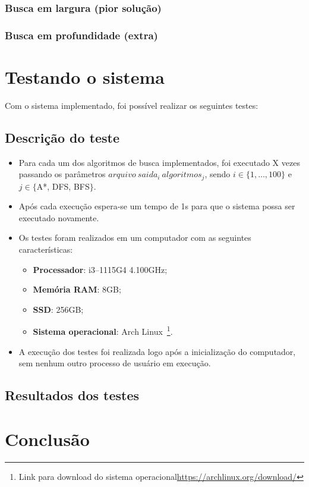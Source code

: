 \documentclass[12pt, a4paper]{article}
\begin{document}
\subsubsection{Busca em largura (pior solução)}\label{sec:bl}
\subsubsection{Busca em profundidade (extra)}\label{sec:bp}

\section{Testando o sistema}\label{sec:testes}
Com o sistema implementado, foi possível realizar os seguintes testes:
\subsection{Descrição do teste}
\begin{itemize}
    \item Para cada um dos algoritmos de busca implementados,
    foi executado X vezes passando os parâmetros \( arquivo ~ saida_i ~ algoritmos_j \),
    sendo \( i \in \{1, \ldots, 100\} \) e \( j \in \{ \)A*, DFS, BFS\( \} \).
    \item Após cada execução espera-se um tempo de 1s para que o sistema possa ser executado novamente.
    \item Os testes foram realizados em um computador com as seguintes características:
    \begin{itemize}
        \item\textbf{Processador}: i3--1115G4 4.100GHz;
        \item\textbf{Memória RAM}: 8GB\@;
        \item\textbf{SSD}: 256GB\@;
        \item\textbf{Sistema operacional}: Arch Linux~\footnote{Link para download do sistema operacional\url{https://archlinux.org/download/}}.
    \end{itemize}
    \item A execução dos testes foi realizada logo após a inicialização do computador, sem nenhum outro processo de usuário em execução.
\end{itemize}

\subsection{Resultados dos testes}\label{sec:res}


\section{Conclusão}\label{sec:concl}

%
\end{document}
